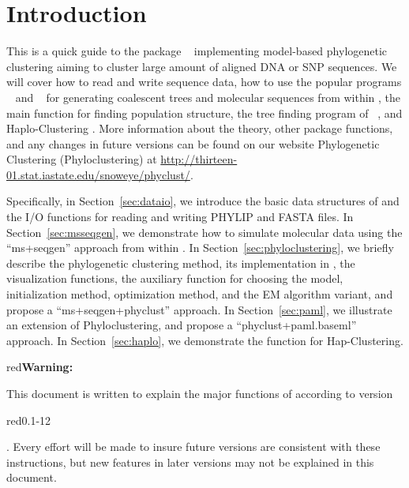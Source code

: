 
\section[Introduction]{Introduction}
\label{sec:introduction}

This is a quick guide to the package ~\citep{snoweye2011}
implementing model-based phylogenetic clustering aiming to cluster
large amount of aligned DNA or SNP sequences.
We will cover how to read and write sequence data,
how to use the popular programs ~\citep{Hudson2002} and ~\citep{Rambaut1997} for generating
coalescent trees and molecular sequences from within ,
the main function  for finding population structure,
the tree finding program  of ~\citep{Yang1997,Yang2007},
and Haplo-Clustering \citep{tzeng2005}.
More information about the theory, other package functions,
and any changes in future versions can be found on our website
Phylogenetic Clustering (Phyloclustering) at
\url{http://thirteen-01.stat.iastate.edu/snoweye/phyclust/}.

Specifically, in Section~\ref{sec:dataio}, we introduce the basic data structures
of  and the I/O functions for reading and writing 
PHYLIP and FASTA files. In Section~\ref{sec:msseqgen},
we demonstrate how to simulate molecular data using the ``ms+seqgen'' approach from within .
In Section~\ref{sec:phyloclustering}, we briefly describe
the phylogenetic clustering method, its implementation in , the visualization functions,
the auxiliary function  for choosing the model, initialization method, optimization method,
and the EM algorithm variant, and propose a ``ms+seqgen+phyclust'' approach.
In Section~\ref{sec:paml}, we illustrate an extension of Phyloclustering, and
propose a ``phyclust+paml.baseml'' approach.
In Section~\ref{sec:haplo}, we demonstrate the function
 for Hap-Clustering.

\begin{color}{red}\bf Warning:\end{color}
This document is written to explain the major functions of 
according to version \begin{color}{red}0.1-12\end{color}.
Every effort will be made to insure future versions are consistent with these
instructions, but new features in later versions may not be explained in this
document.



